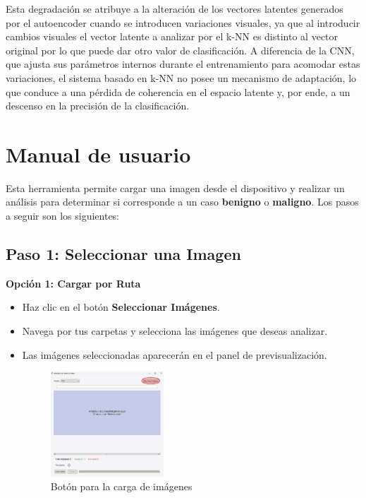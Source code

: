\documentclass[12pt]{article} %
\begin{document}
Esta degradación se atribuye a la alteración de los vectores latentes generados por el autoencoder cuando se introducen variaciones visuales, ya que al introducir cambios visuales el vector latente a analizar por el k-NN es distinto al vector original por lo que puede dar otro valor de clasificación. A diferencia de la CNN, que ajusta sus parámetros internos durante el entrenamiento para acomodar estas variaciones, el sistema basado en k-NN no posee un mecanismo de adaptación, lo que conduce a una pérdida de coherencia en el espacio latente y, por ende, a un descenso en la precisión de la clasificación.\\

\section{Manual de usuario}

Esta herramienta permite cargar una imagen desde el dispositivo y realizar un análisis para determinar si corresponde a un caso \textbf{benigno} o \textbf{maligno}. Los pasos a seguir son los siguientes:
\newpage

\subsection*{Paso 1: Seleccionar una Imagen}

\textbf{Opción 1: Cargar por Ruta}
\begin{itemize}
    \item Haz clic en el botón \textbf{Seleccionar Imágenes}.
    \item Navega por tus carpetas y selecciona las imágenes que deseas analizar.
    \item Las imágenes seleccionadas aparecerán en el panel de previsualización.
    \begin{figure}[!ht]
        \centering
        \includegraphics[width=0.4\textwidth]{CargarRuta.png}
        \caption{Botón para la carga de imágenes}
        \label{fig:imagen_carga}
    \end{figure}
\end{itemize}
\end{document}

